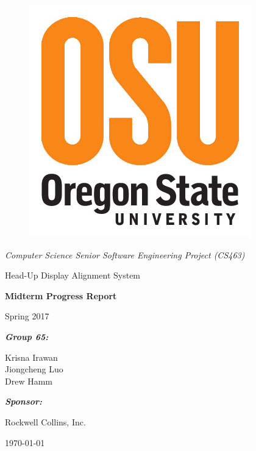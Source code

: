 \documentclass[letterpaper,10pt,onecolumn]{IEEEtran}
\def\title{Computer Science Senior Software Engineering Project (CS463)}
\def\name{Krisna Irawan\\ Jiongcheng Luo\\ Drew Hamm}
\def\doc{Midterm Progress Report}
\def\term{Spring 2017}
\def\project{Head-Up Display Alignment System}
\begin{document}
\begin{titlepage}
\centering
	\begin{figure}
	      	\includegraphics[scale=0.25]{osu_logo}
	\end{figure}
	{\Large\itshape \title\par}
	\vspace{1.5cm}
	\scshape{
		{\Huge \project\par}

		\vspace{1.5cm}
		{\Huge\bfseries\doc\par}
		{\huge \term\par}
	}
	\vspace{2cm}
	{\large\itshape\bfseries Group 65:\par}
	{\large \name\par}
	\vspace{2cm}
	{\large\itshape\bfseries Sponsor:\par}
	{\large Rockwell Collins, Inc.\par}
	\vspace{2cm}
	{\large \today\par}
	\vspace{2cm}

	\begin{abstract}
		This document reports the progress that we have made since the beginning of spring term of 2017. This report mainly introduces our current progress and remaining works of the project, problems that we encoutered our solutions. This report will also cover the highlighted codes of the software as well as a prelimary result of this project.
	\end{abstract}
	\vfill

\end{titlepage}
\tableofcontents


\newpage


\end{document}
